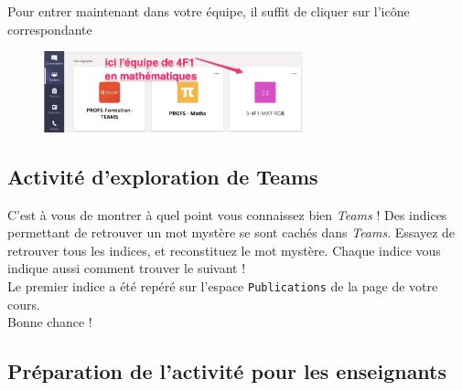  Pour entrer maintenant dans votre équipe, il suffit de cliquer sur l'icône correspondante

\begin{figure}[H]
\includegraphics[width=7.5cm]{./images/teams/entree_classe}
\centering
\end{figure}

\subsection{Activité d'exploration de Teams}

C'est à vous de montrer à quel point vous connaissez bien \emph{Teams} ! Des indices permettant de retrouver un mot mystère se sont cachés dans \emph{Teams}. Essayez de retrouver tous les indices, et reconstituez le mot mystère. Chaque indice vous indique aussi comment trouver le suivant !\\

Le premier indice a été repéré sur l'espace \texttt{Publications} de la page de votre cours. \\Bonne chance !

\subsection*{Préparation de l'activité pour les enseignants}

